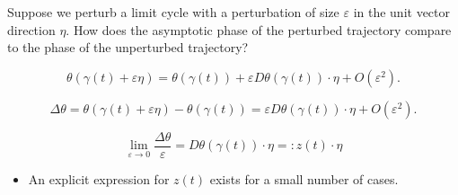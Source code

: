 \documentclass{beamer}
\begin{document}
  
\begin{frame}
Suppose we perturb a limit cycle with a perturbation of size $\varepsilon$ in the unit vector direction $\eta$.  How does the asymptotic phase of the perturbed trajectory compare to the phase of the unperturbed trajectory?

\begin{equation}
\theta(\gamma(t) + \varepsilon \eta) = \theta(\gamma(t)) + \varepsilon D\theta(\gamma(t))\cdot \eta + O(\varepsilon^2).
\end{equation}

\begin{equation}
\Delta \theta = \theta(\gamma(t) + \varepsilon \eta) - \theta(\gamma(t)) = \varepsilon D\theta(\gamma(t))\cdot \eta + O(\varepsilon^2).
\end{equation}

\begin{equation}
\lim_{\varepsilon \rightarrow 0} \frac{\Delta \theta}{\varepsilon} = D\theta(\gamma(t))\cdot \eta =: z(t) \cdot \eta
\end{equation}

\begin{itemize}
 \item An explicit expression for $z(t)$ exists for a small number of cases.
\end{itemize}
\end{frame}


% 
\end{document}
